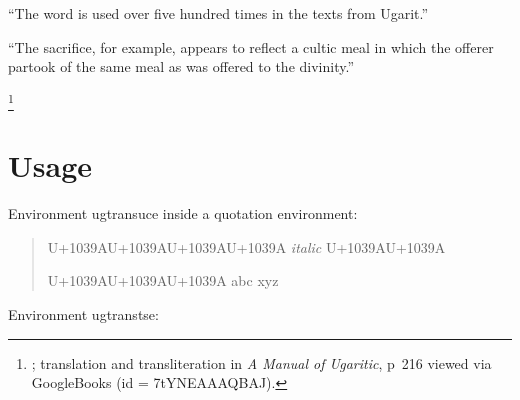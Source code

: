 ``The word  is used over five hundred times in the texts from Ugarit.'' \autocite[28]{a1}


``The  sacrifice, for example, appears to reflect a cultic meal in which the offerer partook of the same meal as was offered to the divinity.'' \autocite[4]{a2}


\footnote{ \cite[Translation in][]{a2}; translation and transliteration in \textit{A Manual of Ugaritic}, p~216 viewed via GoogleBooks (id = 7tYNEAAAQBAJ).}


\printbibliography[
	heading=subbibliography,%
	keyword=ugaritic,
	]





\section{Usage}
Environment ugtransuce inside a quotation environment:

\begin{quotation}
\begin{ugtransuce}
U+1039AU+1039AU+1039AU+1039A \textit{italic} U+1039AU+1039A

U+1039AU+1039AU+1039A  abc xyz
\end{ugtransuce}
\end{quotation}

Environment ugtranstse:

